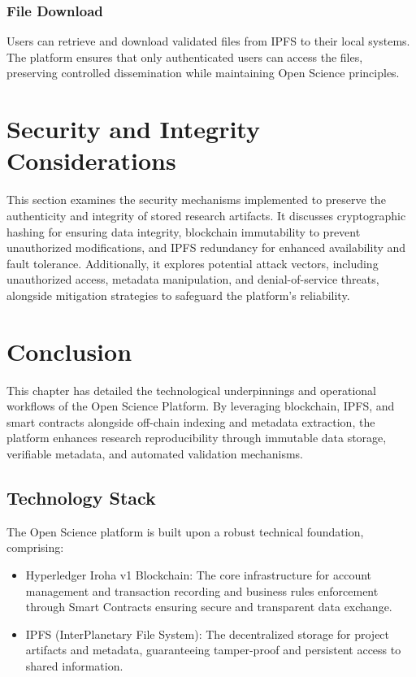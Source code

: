 \documentclass{article}
\begin{document}
\subsubsection{File Download}
Users can retrieve and download validated files from IPFS to their local systems. The platform ensures that only authenticated users can access the files, preserving controlled dissemination while maintaining Open Science principles.

\section{Security and Integrity Considerations}
This section examines the security mechanisms implemented to preserve the authenticity and integrity of stored research artifacts. It discusses cryptographic hashing for ensuring data integrity, blockchain immutability to prevent unauthorized modifications, and IPFS redundancy for enhanced availability and fault tolerance. Additionally, it explores potential attack vectors, including unauthorized access, metadata manipulation, and denial-of-service threats, alongside mitigation strategies to safeguard the platform's reliability.

\section{Conclusion}
This chapter has detailed the technological underpinnings and operational workflows of the Open Science Platform. By leveraging blockchain, IPFS, and smart contracts alongside off-chain indexing and metadata extraction, the platform enhances research reproducibility through immutable data storage, verifiable metadata, and automated validation mechanisms.



\subsection{Technology Stack}

The Open Science platform is built upon a robust technical foundation, comprising:

\begin{itemize}
    \item Hyperledger Iroha v1 Blockchain: The core infrastructure for account management and transaction recording and business rules enforcement through Smart Contracts ensuring secure and transparent data exchange.
    \item IPFS (InterPlanetary File System): The decentralized storage for project artifacts and metadata, guaranteeing tamper-proof and persistent access to shared information.
\end{itemize}
\end{document}
